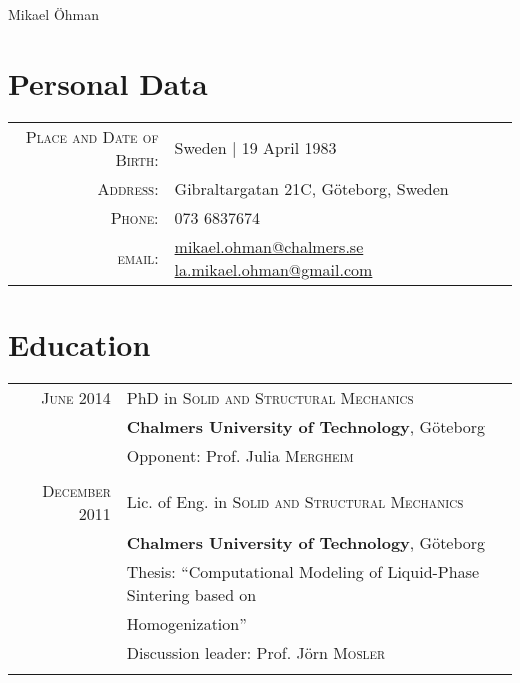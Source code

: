 \documentclass[a4paper,10pt]{article} %
\begin{document}
\par{{\centering
\Huge Mikael Öhman\bigskip
\par} %

\section{Personal Data}

\begin{tabular}{rl}
\textsc{Place and Date of Birth:} & Sweden  | 19 April 1983 \\
\textsc{Address:} & Gibraltargatan 21C, Göteborg, Sweden \\
\textsc{Phone:} & 073 6837674\\
\textsc{email:} & \href{mailto:mikael.ohman@chalmers.se}{mikael.ohman@chalmers.se} 
                  \href{mailto:la.mikael.ohman@gmail.com}{la.mikael.ohman@gmail.com}
\end{tabular}


\section{Education}

\begin{tabular}{rl}


\textsc{June} 2014 & PhD in \textsc{Solid and Structural Mechanics} \\
& \textbf{Chalmers University of Technology}, Göteborg\\
& \small Opponent: Prof. Julia \textsc{Mergheim}\\
&\\


\textsc{December} 2011 & Lic. of Eng. in \textsc{Solid and Structural Mechanics} \\
& \textbf{Chalmers University of Technology}, Göteborg\\
& Thesis: ``Computational Modeling of Liquid-Phase Sintering based on \\
& Homogenization''\\
& \small Discussion leader: Prof. Jörn \textsc{Mosler}\\
&\\


\end{tabular}}
\end{document}
